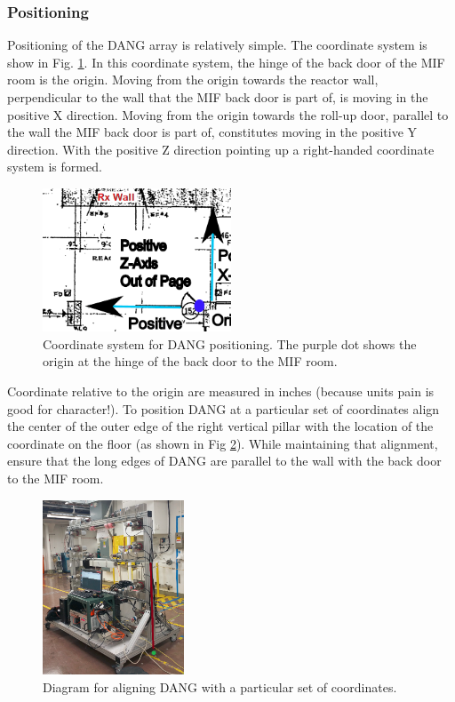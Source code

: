 \documentclass[onecolumn, 10pt, letterpaper, twoside]{article}
\begin{document}
\subsubsection{Positioning}
Positioning of the DANG array is relatively simple. The coordinate system is show in Fig. \ref{fig:Coord-System}. In this coordinate system, the hinge of the back door of the MIF room is the origin. Moving from the origin towards the reactor wall, perpendicular to the wall that the MIF back door is part of, is moving in the positive X direction. Moving from the origin towards the roll-up door, parallel to the wall the MIF back door is part of, constitutes moving in the positive Y direction. With the positive Z direction pointing up a right-handed coordinate system is formed.

\begin{figure}[h!]
\begin{center}
\includegraphics[width=0.5\textwidth]{./Coord_System.png}
\caption{Coordinate system for DANG positioning. The purple dot shows the origin at the hinge of the back door to the MIF room.}
\label{fig:Coord-System}
\end{center}
\end{figure}

Coordinate relative to the origin are measured in inches (because units pain is good for character!). To position DANG at a particular set of coordinates align the center of the outer edge of the right vertical pillar with the location of the coordinate on the floor (as shown in Fig \ref{fig:Positioning-alignment}). While maintaining that alignment, ensure that the long edges of DANG are parallel to the wall with the back door to the MIF room.

\begin{figure}[h!]
\begin{center}
\includegraphics[width=0.375\textwidth]{./Positioning.png}
\caption{Diagram for aligning DANG with a particular set of coordinates.}
\label{fig:Positioning-alignment}
\end{center}
\end{figure}
\end{document}
